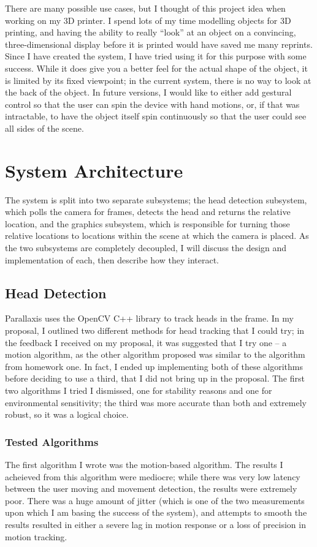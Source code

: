 \documentclass[letterpaper]{article}
\begin{document}
There are many possible use cases, but I thought of this project idea
when working on my 3D printer. I spend lots of my time modelling
objects for 3D printing, and having the ability to really ``look'' at
an object on a convincing, three-dimensional display before it is
printed would have saved me many reprints. Since I have created the
system, I have tried using it for this purpose with some
success. While it does give you a better feel for the actual shape of
the object, it is limited by its fixed viewpoint; in the current
system, there is no way to look at the back of the object. In future
versions, I would like to either add gestural control so that the user
can spin the device with hand motions, or, if that was intractable, to
have the object itself spin continuously so that the user could see
all sides of the scene.

\section{System Architecture}
The system is split into two separate subsystems; the head detection
subsystem, which polls the camera for frames, detects the head and
returns the relative location, and the graphics subsystem, which is
responsible for turning those relative locations to locations within
the scene at which the camera is placed. As the two subsystems are
completely decoupled, I will discuss the design and implementation of
each, then describe how they interact.

\subsection{Head Detection}
Parallaxis uses the OpenCV C++ library to track heads in the frame. In
my proposal, I outlined two different methods for head tracking that I
could try; in the feedback I received on my proposal, it was suggested
that I try one -- a motion algorithm, as the other algorithm proposed
was similar to the algorithm from homework one. In fact, I ended up
implementing both of these algorithms before deciding to use a third,
that I did not bring up in the proposal. The first two algorithms I
tried I dismissed, one for stability reasons and one for environmental
sensitivity; the third was more accurate than both and extremely
robust, so it was a logical choice.

\subsubsection{Tested Algorithms}
The first algorithm I wrote was the motion-based algorithm. The
results I acheieved from this algorithm were mediocre; while there was
very low latency between the user moving and movement detection, the
results were extremely poor. There was a huge amount of jitter (which
is one of the two measurements upon which I am basing the success of
the system), and attempts to smooth the results resulted in either a
severe lag in motion response or a loss of precision in motion
tracking. 
\end{document}

